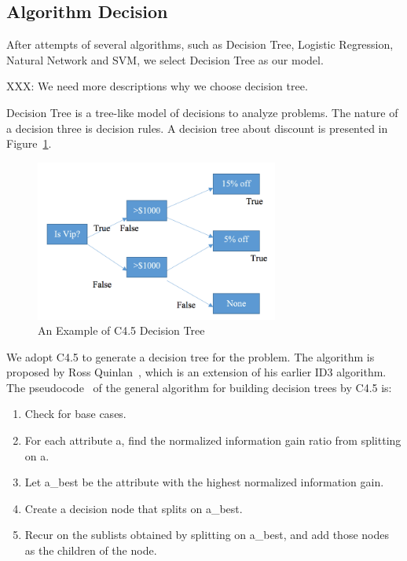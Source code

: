 \documentclass{article}
\begin{document}
\subsection{Algorithm Decision}

After attempts of several algorithms, such as Decision Tree, Logistic Regression, Natural Network and SVM, we select Decision Tree as our model. 

XXX: We need more descriptions why we choose decision tree.

Decision Tree is a tree-like model of decisions to analyze problems. The nature of a decision three is decision rules. A decision tree about discount is presented in Figure~\ref{fig:ctree}.

\begin{figure}[!htbp]
\centering
\includegraphics[width=8.0cm]{ctree.png} 
\newline
\caption{An Example of C4.5 Decision Tree}
\label{fig:ctree} 
\end{figure}

We adopt C4.5 to generate a decision tree for the problem. The algorithm is proposed by Ross Quinlan~\cite{Quinlan}, which is an extension of his earlier ID3 algorithm.
The pseudocode~\cite{Kotsiantis} of the general algorithm for building decision trees by C4.5 is: 

\begin{enumerate}
\item Check for base cases.
\item For each attribute a, find the normalized information gain ratio from splitting on a.
\item Let a\_best be the attribute with the highest normalized information gain.
\item Create a decision node that splits on a\_best.
\item Recur on the sublists obtained by splitting on a\_best, and add those nodes as the children of the node.
\end{enumerate}
\end{document}
